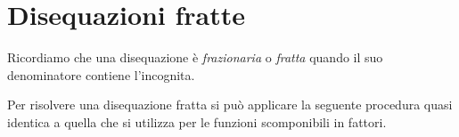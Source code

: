 % 


\section{Disequazioni fratte}
\label{sec:diseq_fratte}

Ricordiamo che una disequazione è \emph{frazionaria} o \emph{fratta} quando 
il suo denominatore contiene l'incognita. 


Per risolvere una disequazione fratta si può applicare la seguente procedura 
quasi identica a quella che si utilizza per le funzioni scomponibili in 
fattori.

